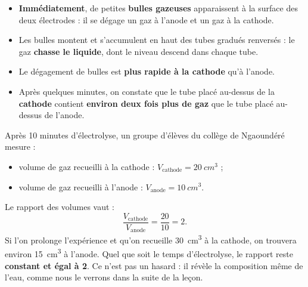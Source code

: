 \documentclass[11pt]{article}
\begin{document}
\begin{itemize}
\item \textbf{Immédiatement}, de petites \textbf{bulles gazeuses} apparaissent à la surface des deux électrodes : il se dégage un gaz à l'anode et un gaz à la cathode.
\item Les bulles montent et s'accumulent en haut des tubes gradués renversés : le gaz \textbf{chasse le liquide}, dont le niveau descend dans chaque tube.
\item Le dégagement de bulles est \textbf{plus rapide à la cathode} qu'à l'anode.
\item Après quelques minutes, on constate que le tube placé au-dessus de la \textbf{cathode} contient \textbf{environ deux fois plus de gaz} que le tube placé au-dessus de l'anode.
\end{itemize}

\begin{exemplebox}
Après 10 minutes d'électrolyse, un groupe d'élèves du collège de Ngaoundéré mesure :
\begin{itemize}
\item volume de gaz recueilli à la cathode : $V_{\text{cathode}} = \SI{20}{cm^3}$ ;
\item volume de gaz recueilli à l'anode : $V_{\text{anode}} = \SI{10}{cm^3}$.
\end{itemize}
Le rapport des volumes vaut :
\[ \frac{V_{\text{cathode}}}{V_{\text{anode}}} = \frac{20}{10} = 2. \]
Si l'on prolonge l'expérience et qu'on recueille \SI{30}{cm^3} à la cathode, on trouvera environ \SI{15}{cm^3} à l'anode. Quel que soit le temps d'électrolyse, le rapport reste \textbf{constant et égal à 2}. Ce n'est pas un hasard : il révèle la composition même de l'eau, comme nous le verrons dans la suite de la leçon.
\end{exemplebox}
\end{document}
